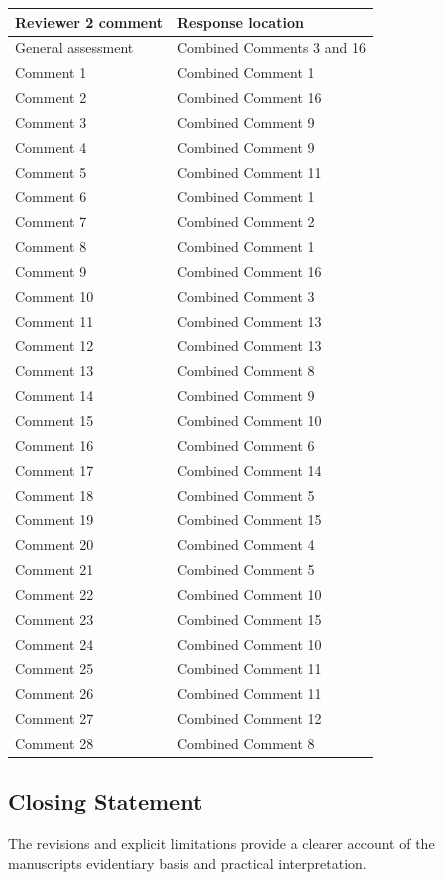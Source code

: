 \documentclass[
  11pt,
  a4paper,
]{article}
\newcounter{none} %
\begin{document}
{\def\LTcaptype{none} %
\begin{longtable}[]{@{}
  >{\raggedright\arraybackslash}p{}
  >{\raggedright\arraybackslash}p{}@{}}
\toprule\noalign{}
\begin{minipage}[b]{\linewidth}\raggedright
Reviewer 2 comment
\end{minipage} & \begin{minipage}[b]{\linewidth}\raggedright
Response location
\end{minipage} \\
\midrule\noalign{}
\endhead
\bottomrule\noalign{}
\endlastfoot
General assessment & Combined Comments 3 and 16 \\
Comment 1 & Combined Comment 1 \\
Comment 2 & Combined Comment 16 \\
Comment 3 & Combined Comment 9 \\
Comment 4 & Combined Comment 9 \\
Comment 5 & Combined Comment 11 \\
Comment 6 & Combined Comment 1 \\
Comment 7 & Combined Comment 2 \\
Comment 8 & Combined Comment 1 \\
Comment 9 & Combined Comment 16 \\
Comment 10 & Combined Comment 3 \\
Comment 11 & Combined Comment 13 \\
Comment 12 & Combined Comment 13 \\
Comment 13 & Combined Comment 8 \\
Comment 14 & Combined Comment 9 \\
Comment 15 & Combined Comment 10 \\
Comment 16 & Combined Comment 6 \\
Comment 17 & Combined Comment 14 \\
Comment 18 & Combined Comment 5 \\
Comment 19 & Combined Comment 15 \\
Comment 20 & Combined Comment 4 \\
Comment 21 & Combined Comment 5 \\
Comment 22 & Combined Comment 10 \\
Comment 23 & Combined Comment 15 \\
Comment 24 & Combined Comment 10 \\
Comment 25 & Combined Comment 11 \\
Comment 26 & Combined Comment 11 \\
Comment 27 & Combined Comment 12 \\
Comment 28 & Combined Comment 8 \\
\end{longtable}
}

\subsection{Closing Statement}\label{closing-statement}

The revisions and explicit limitations provide a clearer account of the
manuscript\textquotesingle s evidentiary basis and practical
interpretation.
\end{document}
